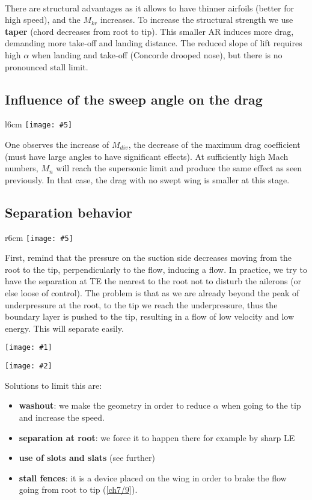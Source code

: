 \documentclass[british,french,11pt, a4paper, openany]{article}
\newcommand{\wrapfig}[6]{%
	\begin{wrapfigure}[#1]{#2}{#3cm}%
		\vspace{-5mm}%
		\texttt{[image: \#5]}%
		\captionof{figure}{}%
		\label{#6}%
	\end{wrapfigure}%
}
\newcommand{\minifig}[6]{
	\begin{center}%
		\begin{minipage}{#5\textwidth}%
			\texttt{[image: \#1]}%
			\captionof{figure}{}%
			\label{#1}%
		\end{minipage}%
		\begin{minipage}{#6\textwidth}%
			\texttt{[image: \#2]}%
			\captionof{figure}{}%
			\label{#2}%
		\end{minipage}%
	\end{center}
}
\begin{document}
\ \\ There are structural advantages as it allows to have thinner airfoils (better for high speed), and the $M_{kr}$ increases. To increase the structural strength we use \textbf{taper} (chord decreases from root to tip). This smaller AR induces more drag, demanding more take-off and landing distance. The reduced slope of lift requires high $\alpha$ when landing and take-off (Concorde drooped nose), but there is no pronounced stall limit.    

\subsection{Influence of the sweep angle on the drag}	
\wrapfig{7}{l}{6}{0.1}{ch7/7}{ch7/7}
One observes the increase of $M_{div}$, the decrease of the maximum drag coefficient (must have large angles to have significant effects). At sufficiently high Mach numbers, $M_n$ will reach the supersonic limit and produce the same effect as seen previously. In that case, the drag with no swept wing is smaller at this stage. 

\subsection{Separation behavior}
\wrapfig{9}{r}{6}{0.1}{ch7/8}{ch7/8}
First, remind that the pressure on the suction side decreases moving from the root to the tip, perpendicularly to the flow, inducing a flow. In practice, we try to have the separation at TE the nearest to the root not to disturb the ailerons (or else loose of control). The problem is that as we are already beyond the peak of underpressure at the root, to the tip we reach the underpressure, thus the boundary layer is pushed to the tip, resulting in a flow of low velocity and low energy. This will separate easily. 

\minifig{ch7/9}{ch7/10}{0.12}{0.1}{0.35}{0.3}

Solutions to limit this are: 

\begin{itemize}
	\item[•] \textbf{washout}: we make the geometry in order to reduce $\alpha$ when going to the tip and increase the speed.
	
	\item[•] \textbf{separation at root}: we force it to happen there for example by sharp LE
	
	\item[•] \textbf{use of slots and slats} (see further)
	
	\item[•] \textbf{stall fences}: it is a device placed on the wing in order to brake the flow going from root to tip (\autoref{ch7/9}).
\end{itemize}
\end{document}
